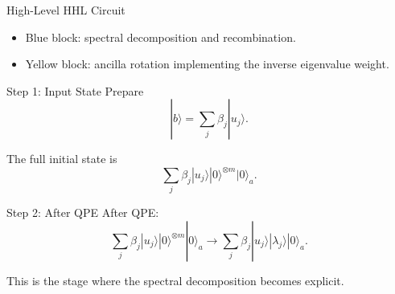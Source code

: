 \documentclass{beamer}
\begin{document}
\begin{frame}{High-Level HHL Circuit}
\centering
{}

\begin{itemize}
\item Blue block: spectral decomposition and recombination.
\item Yellow block: ancilla rotation implementing the inverse eigenvalue weight.
\end{itemize}
\end{frame}


\begin{frame}{Step 1: Input State}
Prepare
\[
|b\rangle = \sum_j \beta_j |u_j\rangle.
\]

The full initial state is
\[
\sum_j \beta_j |u_j\rangle |0\rangle^{\otimes m}|0\rangle_a.
\]
\end{frame}


\begin{frame}{Step 2: After QPE}
After QPE:
\[
\sum_j \beta_j |u_j\rangle |0\rangle^{\otimes m}|0\rangle_a
\longrightarrow
\sum_j \beta_j |u_j\rangle |\lambda_j\rangle |0\rangle_a.
\]

This is the stage where the spectral decomposition becomes explicit.
\end{frame}
\end{document}
